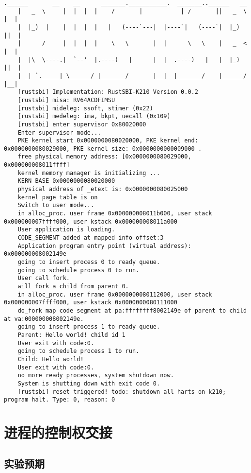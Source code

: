\begin{lstlisting}[caption={lab7实验结果（移植K210后）}]
    .______       __    __      _______.___________.  _______..______   __
    |   _  \     |  |  |  |    /       |           | /       ||   _  \ |  |
    |  |_)  |    |  |  |  |   |   (----`---|  |----`|   (----`|  |_)  ||  |
    |      /     |  |  |  |    \   \       |  |      \   \    |   _  < |  |
    |  |\  \----.|  `--'  |.----)   |      |  |  .----)   |   |  |_)  ||  |
    | _| `._____| \______/ |_______/       |__|  |_______/    |______/ |__|
    [rustsbi] Implementation: RustSBI-K210 Version 0.0.2
    [rustsbi] misa: RV64ACDFIMSU
    [rustsbi] mideleg: ssoft, stimer (0x22)
    [rustsbi] medeleg: ima, bkpt, uecall (0x109)
    [rustsbi] enter supervisor 0x80020000
    Enter supervisor mode...
    PKE kernel start 0x0000000080020000, PKE kernel end: 0x0000000080029000, PKE kernel size: 0x0000000000009000 .
    free physical memory address: [0x0000000080029000, 0x000000008011ffff]
    kernel memory manager is initializing ...
    KERN_BASE 0x0000000080020000
    physical address of _etext is: 0x0000000080025000
    kernel page table is on
    Switch to user mode...
    in alloc_proc. user frame 0x000000008011b000, user stack 0x000000007ffff000, user kstack 0x000000008011a000
    User application is loading.
    CODE_SEGMENT added at mapped info offset:3
    Application program entry point (virtual address): 0x000000008002149e
    going to insert process 0 to ready queue.
    going to schedule process 0 to run.
    User call fork.
    will fork a child from parent 0.
    in alloc_proc. user frame 0x0000000080112000, user stack 0x000000007ffff000, user kstack 0x0000000080111000
    do_fork map code segment at pa:ffffffff8002149e of parent to child at va:000000008002149e.
    going to insert process 1 to ready queue.
    Parent: Hello world! child id 1
    User exit with code:0.
    going to schedule process 1 to run.
    Child: Hello world!
    User exit with code:0.
    no more ready processes, system shutdown now.
    System is shutting down with exit code 0.
    [rustsbi] reset triggered! todo: shutdown all harts on k210; program halt. Type: 0, reason: 0
\end{lstlisting}


\section{进程的控制权交接}

\subsection{实验预期}

